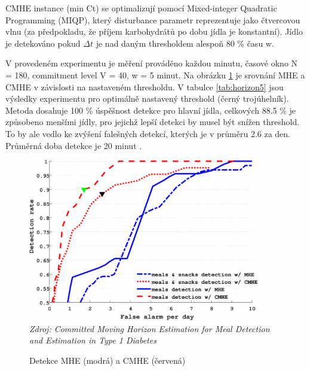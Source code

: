 CMHE instance (min Ct) se optimalizují pomocí Mixed-integer Quadratic Programming (MIQP), který disturbance parametr reprezentuje jako čtvercovou vlnu (za předpokladu, že příjem karbohydrátů po dobu jídla je konstantní). Jídlo je detekováno pokud $\Delta t$ je nad daným thresholdem alespoň 80 \% času w.

V provedeném experimentu je měření prováděno každou minutu, časové okno N = 180, commitment level V = 40, w = 5 minut. Na obrázku \ref{fig:horizon4} je srovnání MHE a CMHE v závislosti na nastaveném thresholdu.  V tabulce \ref{tab:horizon5} jsou výsledky experimentu pro optimálně nastavený threshold (černý trojúhelník). Metoda dosahuje 100 \% úspěšnost detekce pro hlavní jídla, celkových 88.5 \% je způsobeno menšími jídly, pro jejichž lepší detekci by musel být snížen threshold. To by ale vedlo ke zvýšení falešných detekcí, kterých je v průměru 2.6 za den. Průměrná doba detekce je 20 minut \citep{Analyza.MovingHorizon}.

\begin{figure}[H]
\caption{Detekce MHE (modrá) a CMHE (červená)}
\label{fig:horizon4}
\centering
\includegraphics[width=0.9\textwidth]{img/analyza/horizon4.png}\\
\textit{Zdroj: Committed Moving Horizon Estimation for Meal Detection and Estimation in Type 1 Diabetes \citep{Analyza.MovingHorizon}}
\end{figure}

